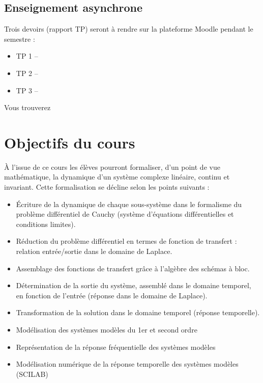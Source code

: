 \documentclass[a4paper,11pt]{article}
\begin{document}
\subsection*{Enseignement asynchrone}

Trois devoirs (rapport TP) seront à rendre sur la plateforme Moodle pendant le semestre :
\begin{itemize}
    \item TP 1 --
    \item TP 2 -- 
    \item TP 3 -- 
\end{itemize}

Vous trouverez 


\section*{Objectifs du cours}

À  l'issue  de  ce  cours  les  élèves  pourront  formaliser,  d'un  point  de  vue  mathématique,  
la dynamique d'un système complexe linéaire, continu et invariant. Cette formalisation se décline selon 
les points suivants :  

\begin{itemize}
    \item \'Ecriture  de  la  dynamique  de  chaque  sous-système  dans  le  formalisme  du  
          problème différentiel de Cauchy (système d'équations différentielles et conditions limites).
    \item Réduction du problème différentiel en termes de fonction de transfert : relation entrée/sortie 
          dans le domaine de Laplace.
    \item Assemblage des fonctions de transfert grâce à l'algèbre des schémas à bloc. 
    \item Détermination de la sortie du système, assemblé dans le domaine temporel, en fonction 
          de l'entrée (réponse dans le domaine de Laplace).
    \item Transformation de la solution dans le domaine temporel (réponse temporelle).
    \item Modélisation des systèmes modèles du 1er et second ordre 
    \item Représentation de la réponse fréquentielle des systèmes modèles
    \item Modélisation numérique de la réponse temporelle des systèmes modèles (SCILAB)
\end{itemize}
\end{document}
